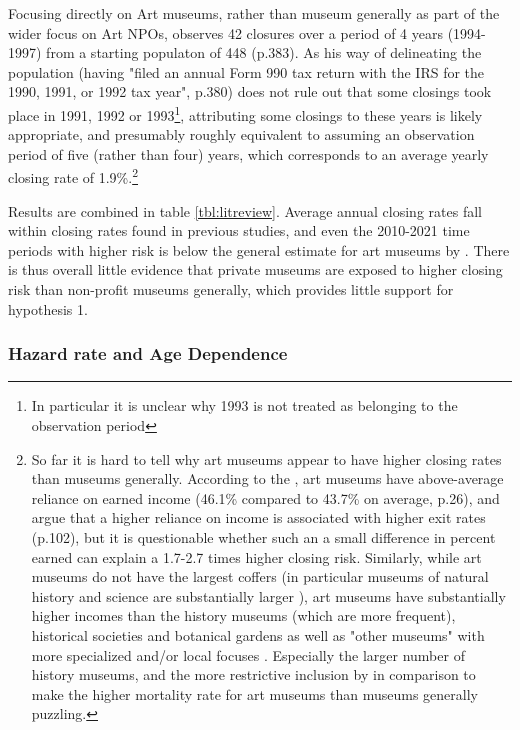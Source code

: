 \documentclass[12pt]{article}
\begin{document}
Focusing directly on Art museums, rather than museum generally as part of the wider focus on Art NPOs, \textcite{Hager_2001_vulnerability} observes 42 closures over a period of 4 years (1994-1997) from a starting populaton of 448 (p.383).
As his way of delineating the population (having "filed an annual Form 990 tax return with the IRS for the 1990, 1991, or 1992 tax year", p.380) does not rule out that some closings took place in 1991, 1992 or 1993\footnote{In particular it is unclear why 1993 is not treated as belonging to the observation period}, attributing some closings to these years is likely appropriate, and presumably roughly equivalent to assuming an observation period of five (rather than four) years, which corresponds to an average yearly closing rate of 1.9\%.\footnote{So far it is hard to tell why art museums appear to have higher closing rates than museums generally.
According to the \textcite{IMLS_2008_funding}, art museums have above-average reliance on earned income (46.1\% compared to 43.7\% on average, p.26), and \textcite{Bowen_etal_1994_charitable} argue that a higher reliance on income is associated with higher exit rates (p.102), but it is questionable whether such an a small difference in percent earned can explain a 1.7-2.7 times higher closing risk.
Similarly, while art museums do not have the largest coffers (in particular museums of natural history and science are substantially larger \parencite{IMLS_2008_funding,Bowen_etal_1994_charitable}), art museums have substantially higher incomes than the history museums (which are more frequent), historical societies and botanical gardens \parencite{IMLS_2008_funding} as well as "other museums" with more specialized and/or local focuses \parencite{Bowen_etal_1994_charitable}.
Especially the larger number of history museums, and the more restrictive inclusion by \textcite{Hager_2001_vulnerability} in comparison to \textcite{Bowen_etal_1994_charitable} make the higher mortality rate for art museums than museums generally puzzling.} 




Results are combined in table \ref{tbl:litreview}.
Average annual closing rates fall within closing rates found in previous studies, and even the 2010-2021 time periods with higher risk is below the general estimate for art museums by \textcite{Hager_2001_vulnerability}.
There is thus overall little evidence that private museums are exposed to higher closing risk than non-profit museums generally, which provides little support for hypothesis 1.
\subsubsection*{Hazard rate and Age Dependence}
\end{document}
